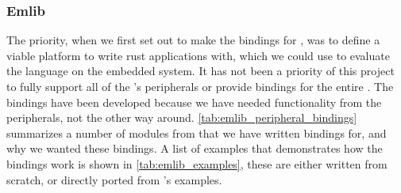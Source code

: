 \subsubsection{Emlib}

The priority, when we first set out to make the bindings for {\emlib}, was to define a viable platform to write rust applications with, which we could use to evaluate the language on the embedded system.
It has not been a priority of this project to fully support all of the {\gecko}'s peripherals or provide bindings for the entire {\emlib}.
The bindings have been developed because we have needed functionality from the peripherals, not the other way around.
\autoref{tab:emlib_peripheral_bindings} summarizes a number of modules from {\emlib} that we have written bindings for, and why we wanted these bindings.
A list of examples that demonstrates how the bindings work is shown in \autoref{tab:emlib_examples}, these are either written from scratch, or directly ported from {\emlib}'s examples.

